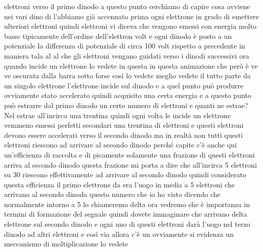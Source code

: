 elettroni verso il primo dinodo a questo punto cerchiamo di capire cosa avviene nei vari dino di l'abbiamo già accennato prima ogni elettrone in grado di emettere ulteriori elettroni quindi elettroni vi diceva che vengono emessi con energia molto basse tipicamente dell'ordine dell'elettron volt e ogni dinodo è posto a un potenziale la differenza di potenziale di circa 100 volt rispetto a precedente in maniera tala al al che gli elettroni vengano guidati verso i dinodi successivi ora quando incide un elettrone lo vedete in questa in questa animazione che però è ve ve oscurata dalla barra sotto forse così lo vedete meglio vedete il tutto parte da un singolo elettrone l'elettrone incide sul dinodo e a quel punto può produrre ovviamente stato accelerato quindi acquisito una certa energia e a questo punto può estrarre dal primo dinodo un certo numero di elettroni e quanti ne estrae? Nel estrae all'incirca una trentina quindi ogni volta le incide un elettrone vemmeno emessi perfetti secondari una trentina di elettroni e questi elettroni devono essere accelerati verso il secondo dinodo ma in realtà non tutti questi elettroni riescono ad arrivare al secondo dinodo perché capite c'è anche qui un'efficienza di raccolta e di picamente solamente una frazione di questi elettroni arriva al secondo dinodo questa frazione mi porta a dire che all'incirca 5 elettroni su 30 riescono effettivamente ad arrivare al secondo dinodo quindi considerato questa efficienza il primo elettrone da era l'uogo in media a 5 elettroni che arrivano al secondo dinodo questo numero che io ho visto dicendo che normalmente intorno a 5 lo chiameremo delta ora vedremo che è importanza in termini di formazione del segnale quindi dovete immaginare che arrivano delta elettrone sul secondo dinodo e ogni uno di questi elettroni darà l'uogo nel terzo dinodo ad altri elettroni e così via allora c'è un ovviamente si evidenza un meccanismo di moltiplicazione lo vedete


